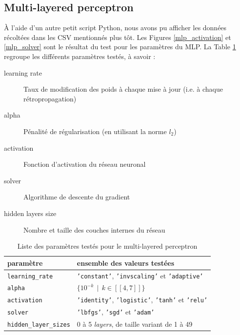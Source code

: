 \documentclass[a4paper]{report}
\begin{document}

\subsection{Multi-layered perceptron}

À l'aide d'un autre petit script Python, nous avons pu afficher les données récoltées dans les CSV mentionnés plus tôt. Les Figures \ref{mlp_activation} et \ref{mlp_solver} sont le résultat du test pour les paramètres du MLP. La Table \ref{params_mlp} regroupe les différents paramètres testés, à savoir :
\begin{description}
\item[learning rate] Taux de modification des poids à chaque mise à jour (i.e. à chaque rétropropagation)
\item[alpha] Pénalité de régularisation (en utilisant la norme $l_2$)
\item[activation] Fonction d'activation du réseau neuronal
\item[solver] Algorithme de descente du gradient
\item[hidden layers size] Nombre et taille des couches internes du réseau
\end{description}

\begin{table}
\centering
\begin{tabular}{l l}
paramètre & ensemble des valeurs testées \\
\hline
\texttt{learning\_rate} & \texttt{'constant'}, \texttt{'invscaling'} et \texttt{'adaptive'}\\
\texttt{alpha} & $\{10^{-k} \>\> | \>\> k \in [\![4, 7]\!] \}$ \\
\texttt{activation} & \texttt{'identity'}, \texttt{'logistic'}, \texttt{'tanh'} et \texttt{'relu'} \\
\texttt{solver} &\texttt{'lbfgs'}, \texttt{'sgd'} et \texttt{'adam'}\\
\texttt{hidden\_layer\_sizes} & 0 à 5 \emph{layers}, de taille variant de 1 à 49\\
\end{tabular}
\caption{Liste des paramètres testés pour le multi-layered perceptron\label{params_mlp}}
\end{table}
\end{document}
